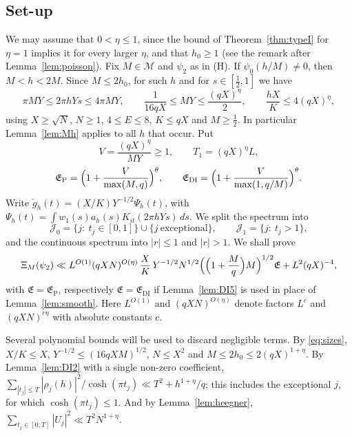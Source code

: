 \documentclass[11pt]{amsart}
\theoremstyle{remark}
\theoremstyle{definition}
\numberwithin{equation}{section}
\newcommand{\Mset}{\mathcal{M}}
\newcommand{\Jc}{\mathcal{J}}
\begin{document}
\subsection{Set-up}
We may assume that $0<\eta\le1$, since the bound of Theorem~\ref{thm:typeI} for $\eta=1$ implies it for every larger $\eta$, and that $h_0\ge1$ (see the remark after Lemma~\ref{lem:poisson}). Fix $M\in\Mset$ and $\psi_2$ as in (H). If $\psi_0(h/M)\ne0$, then $M<h<2M$. Since $M\le2h_0$, for such $h$ and for $s\in[\frac12,1]$ we have
\begin{equation}\label{eq:sizes}
\pi MY\le2\pi hYs\le4\pi MY,\qquad\frac1{16qX}\le MY\le\frac{(qX)^\eta}{2},\qquad\frac{hX}K\le4(qX)^\eta,
\end{equation}
using $X\ge\sqrt N$, $N\ge1$, $4\le E\le8$, $K\le qX$ and $M\ge\frac12$. In particular Lemma~\ref{lem:Mh} applies to all $h$ that occur. Put
\[
V=\frac{(qX)^\eta}{MY}\ge1,\qquad T_1=(qX)^\eta L,
\]
\[
\mathfrak E_{\mathrm P}=\Bigl(1+\frac{V}{\max(M,q)}\Bigr)^{\theta},\qquad\mathfrak E_{\mathrm{DI}}=\Bigl(1+\frac{V}{\max(1,q/M)}\Bigr)^{\theta}.
\]
Write $\check g_h(t)=(X/K)Y^{-1/2}\Psi_h(t)$, with $\Psi_h(t)=\int w_1(s)a_h(s)K_{it}(2\pi hYs)\,ds$. We split the spectrum into
\[
\Jc_0=\{j:\ t_j\in[0,1]\}\cup\{j\ \text{exceptional}\},\qquad\Jc_1=\{j:\ t_j>1\},
\]
and the continuous spectrum into $|r|\le1$ and $|r|>1$. We shall prove
\begin{equation}\label{eq:XiMbound}
\Xi_M(\psi_2)\ll L^{O(1)}(qXN)^{O(\eta)}\,\frac XK\,Y^{-1/2}N^{1/2}\Bigl(\Bigl(1+\frac Mq\Bigr)M\Bigr)^{1/2}\mathfrak E+L^{2}(qX)^{-4},
\end{equation}
with $\mathfrak E=\mathfrak E_{\mathrm P}$, respectively $\mathfrak E=\mathfrak E_{\mathrm{DI}}$ if Lemma~\ref{lem:DI5} is used in place of Lemma~\ref{lem:smooth}. Here $L^{O(1)}$ and $(qXN)^{O(\eta)}$ denote factors $L^{c}$ and $(qXN)^{c\eta}$ with absolute constants $c$.

Several polynomial bounds will be used to discard negligible terms. By \eqref{eq:sizes}, $X/K\le X$, $Y^{-1/2}\le(16qXM)^{1/2}$, $N\le X^2$ and $M\le2h_0\le2(qX)^{1+\eta}$. By Lemma~\ref{lem:DI2} with a single non-zero coefficient, $\sum_{|t_j|\le T}|\rho_j(h)|^2/\cosh(\pi t_j)\ll T^2+h^{1+\eta}/q$; this includes the exceptional $j$, for which $\cosh(\pi t_j)\le1$. And by Lemma~\ref{lem:heegner}, $\sum_{t_j\in[0,T]}|U_j|^2\ll T^2N^{1+\eta}$.
\end{document}
